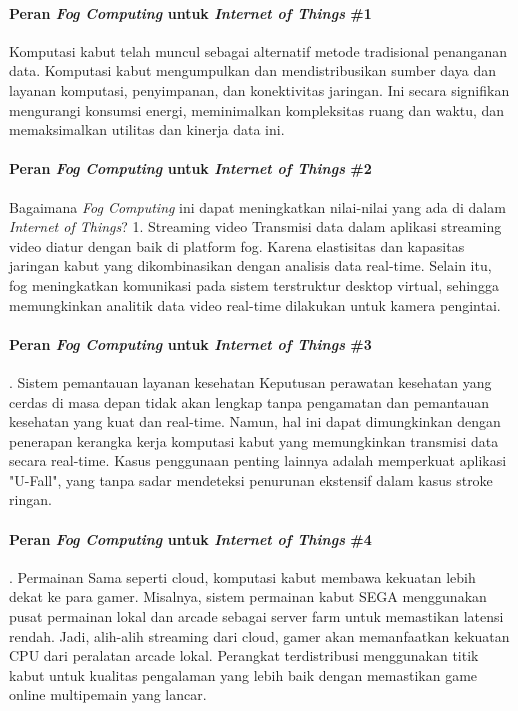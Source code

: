 \begin{frame}{\insertsectionhead}
	\framesubtitle{Peran \textit{Fog Computing} untuk \textit{Internet of Things} \#1}
	\justifying
	Komputasi kabut telah muncul sebagai alternatif metode tradisional penanganan data. Komputasi kabut mengumpulkan dan mendistribusikan sumber daya dan layanan komputasi, penyimpanan, dan konektivitas jaringan. Ini secara signifikan mengurangi konsumsi energi, meminimalkan kompleksitas ruang dan waktu, dan memaksimalkan utilitas dan kinerja data ini.
\end{frame}

\begin{frame}{\insertsectionhead}
	\framesubtitle{Peran \textit{Fog Computing} untuk \textit{Internet of Things} \#2}
	\justifying
	Bagaimana \textit{Fog Computing} ini dapat meningkatkan nilai-nilai yang ada di dalam \textit{Internet of Things}?
	\vfill
	1. Streaming video
	\vfill
	Transmisi data dalam aplikasi streaming video diatur dengan baik di platform fog. Karena elastisitas dan kapasitas jaringan kabut yang dikombinasikan dengan analisis data real-time. Selain itu, fog meningkatkan komunikasi pada sistem terstruktur desktop virtual, sehingga memungkinkan analitik data video real-time dilakukan untuk kamera pengintai.
\end{frame}

\begin{frame}{\insertsectionhead}
	\framesubtitle{Peran \textit{Fog Computing} untuk \textit{Internet of Things} \#3}
	. Sistem pemantauan layanan kesehatan
	\vfill
	Keputusan perawatan kesehatan yang cerdas di masa depan tidak akan lengkap tanpa pengamatan dan pemantauan kesehatan yang kuat dan real-time. Namun, hal ini dapat dimungkinkan dengan penerapan kerangka kerja komputasi kabut yang memungkinkan transmisi data secara real-time.
	\vfill
	Kasus penggunaan penting lainnya adalah memperkuat aplikasi "U-Fall", yang tanpa sadar mendeteksi penurunan ekstensif dalam kasus stroke ringan.
\end{frame}

\begin{frame}{\insertsectionhead}
	\framesubtitle{Peran \textit{Fog Computing} untuk \textit{Internet of Things} \#4}
	. Permainan
	\vfill
	Sama seperti cloud, komputasi kabut membawa kekuatan lebih dekat ke para gamer. Misalnya, sistem permainan kabut SEGA menggunakan pusat permainan lokal dan arcade sebagai server farm untuk memastikan latensi rendah.
	\vfill
	Jadi, alih-alih streaming dari cloud, gamer akan memanfaatkan kekuatan CPU dari peralatan arcade lokal. Perangkat terdistribusi menggunakan titik kabut untuk kualitas pengalaman yang lebih baik dengan memastikan game online multipemain yang lancar.
\end{frame}

